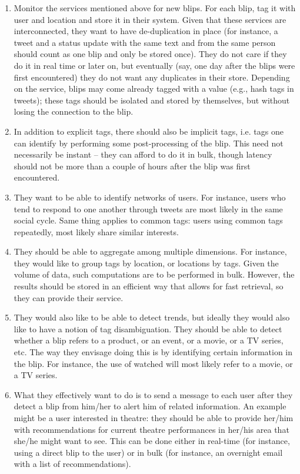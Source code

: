 \documentclass[12pt,a4paper]{article}
\begin{document}
\begin{enumerate}
\item Monitor the services mentioned above for new blips. For each blip, tag it with user and location and store it in their system. Given that these services are interconnected, they want to have de-duplication in place (for instance, a tweet and a status update with the same text and from the same person should count as one blip and only be stored once). They do not care if they do it in real time or later on, but eventually (say, one day after the blips were first encountered) they do not want any duplicates in their store. Depending on the service, blips may come already tagged with a value (e.g., hash tags in tweets); these tags should be isolated and stored by themselves, but without losing the connection to the blip.
\item In addition to explicit tags, there should also be implicit tags, i.e. tags one can identify by performing some post-processing of the blip. This need not necessarily be instant -- they can afford to do it in bulk, though latency should not be more than a couple of hours after the blip was first encountered.
\item They want to be able to identify networks of users. For instance, users who tend to respond to one another through tweets are most likely in the same social cycle. Same thing applies to common tags: users using common tags repeatedly, most likely share similar interests.
\item They should be able to aggregate among multiple dimensions. For instance, they would like to group tags by location, or locations by tags. Given the volume of data, such computations are to be performed in bulk. However, the results should be stored in an efficient way that allows for fast retrieval, so they can provide their service.
\item They would also like to be able to detect trends, but ideally they would also like to have a notion of tag disambiguation. They should be able to detect whether a blip refers to a product, or an event, or a movie, or a TV series, etc. The way they envisage doing this is by identifying certain information in the blip. For instance, the use of watched will most likely refer to a movie, or a TV series.
\item What they effectively want to do is to send a message to each user after they detect a blip from him/her to alert him of related information. An example might be a user interested in theatre: they should be able to provide her/him with recommendations for current theatre performances in her/his area that she/he might want to see. This can be done either in real-time (for instance, using a direct blip to the user) or in bulk (for instance, an overnight email with a list of recommendations).

\end{enumerate}
\end{document}
